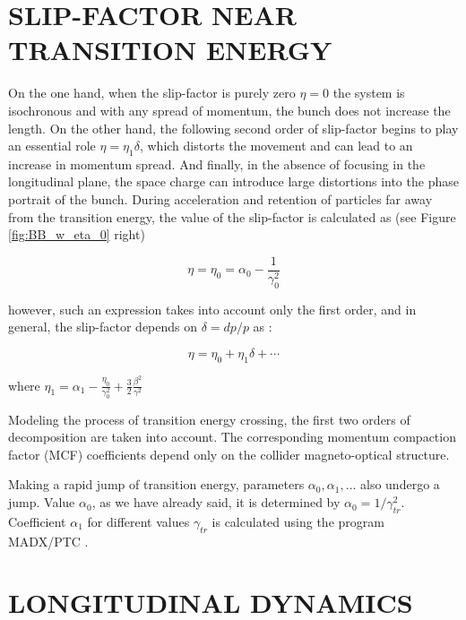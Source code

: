 \documentclass[a4paper,
               keeplastbox,   %
               ]{jacow}
\begin{document}
\section{SLIP-FACTOR NEAR TRANSITION ENERGY}

\par On the one hand, when the slip-factor is purely zero $\eta=0$ the system is isochronous and with any spread of momentum, the bunch does not increase the length. On the other hand, the following second order of slip-factor begins to play an essential role $\eta=\eta_{1}\delta$, which distorts the movement and can lead to an increase in momentum spread. And finally, in the absence of focusing in the longitudinal plane, the space charge can introduce large distortions into the phase portrait of the bunch.
During acceleration and retention of particles far away from the transition energy, the value of the slip-factor is calculated as (see Figure \ref{fig:BB_w_eta_0} right)

\begin{equation}\label{eq:eta_0}
\eta=\eta_{0}=\alpha_{0}-\frac{1}{\gamma_{0}^{2}}
\end{equation}

\par however, such an expression takes into account only the first order, and in general, the slip-factor depends on $\delta=dp/p$ as \cite{Ng}:

\begin{equation}\label{eq:eta}
\eta=\eta_{0}+\eta_{1} \delta+\cdots
\end{equation}

\par where $\eta_{1}=\alpha_{1}-\frac{\eta_{0}}{\gamma_{0}^{2}}+\frac{3}{2} \frac{\beta^{2}}{\gamma^{2}}$

\par Modeling the process of transition energy crossing, the first two orders of decomposition are taken into account. The corresponding momentum compaction factor (MCF) coefficients depend only on the collider magneto-optical structure.

\par Making a rapid jump of transition energy, parameters $\alpha_{0}, \alpha_{1},\ldots$ also undergo a jump. Value $\alpha_{0}$, as we have already said, it is determined by  $\alpha_{0}=1/\gamma_{tr}^2$. Coefficient $\alpha_{1}$ for different values $\gamma_{tr}$ is calculated using the program MADX/PTC \cite{MADX}.

\section{LONGITUDINAL DYNAMICS}
\end{document}
